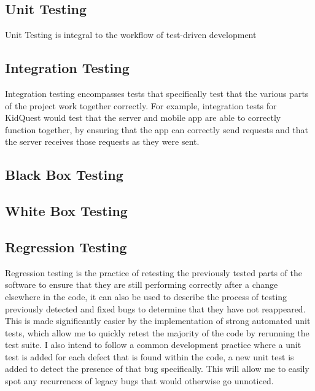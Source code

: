 \subsection{Unit Testing} 
Unit Testing is integral to the workflow of test-driven development

\subsection{Integration Testing}
Integration testing encompasses tests that specifically test that the various parts of the project work together correctly.
For example, integration tests for KidQuest would test that the server and mobile app are able to correctly function together, by ensuring that the app can correctly send requests and that the server receives those requests as they were sent.


\subsection{Black Box Testing}

\subsection{White Box Testing}


\subsection{Regression Testing}
Regression testing is the practice of retesting the previously tested parts of the software to ensure that they are still performing correctly after a change elsewhere in the code, it can also be used to describe the process of testing previously detected and fixed bugs to determine that they have not reappeared.
This is made significantly easier by the implementation of strong automated unit tests, which allow me to quickly retest the majority of the code by rerunning the test suite.
I also intend to follow a common development practice where a unit test is added for each defect that is found within the code, a new unit test is added to detect the presence of that bug specifically. 
This will allow me to easily spot any recurrences of legacy bugs that would otherwise go unnoticed.

